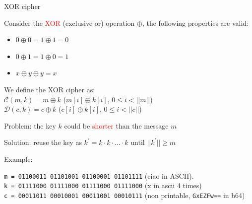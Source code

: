 \begin{frame}{XOR cipher}

  Consider the \textcolor{red}{XOR} (exclusive or) operation $\oplus$, the following properties are valid:
  
  \begin{itemize}
    \item $0 \oplus 0 = 1 \oplus 1 = 0$ 
    \item $0 \oplus 1 = 1 \oplus 0 = 1$ 
    \item $x \oplus y \oplus y = x$ 
  \end{itemize}
  
  \medskip
  \pause
  
  We define the XOR cipher as:\\
    
  \phantom{pad}$\mathcal{C}(m, k) = m \oplus k$ \phantom{padding} ($m[i] \oplus k[i]$, $0 \leq i < ||m||$)\\
  
  \phantom{pad}$\mathcal{D}(c, k) = c \oplus k$ \phantom{paddingg} ($c[i] \oplus k[i]$, $0 \leq i < ||c||$)

  \medskip
  
  \pause

  Problem: the key $k$ could be \textcolor{red}{shorter} than the message $m$
  
  Solution: reuse the key as $k^{'} = k \cdot k \cdot \ldots \cdot k$ until $||k^{'}|| \geq m$

  \medskip
  \pause
  
  Example:
  
  \phantom{pad}\texttt{m = 01100011 01101001 01100001 01101111} (ciao in ASCII).\\
  \phantom{pad}\texttt{k = 01111000 01111000 01111000 01111000} (x in ascii 4 times)\\
  \phantom{pad}\texttt{c = 00011011 00010001 00011001 00010111} (non printable, \texttt{GxEZFw==} in b64)
  
\end{frame}

